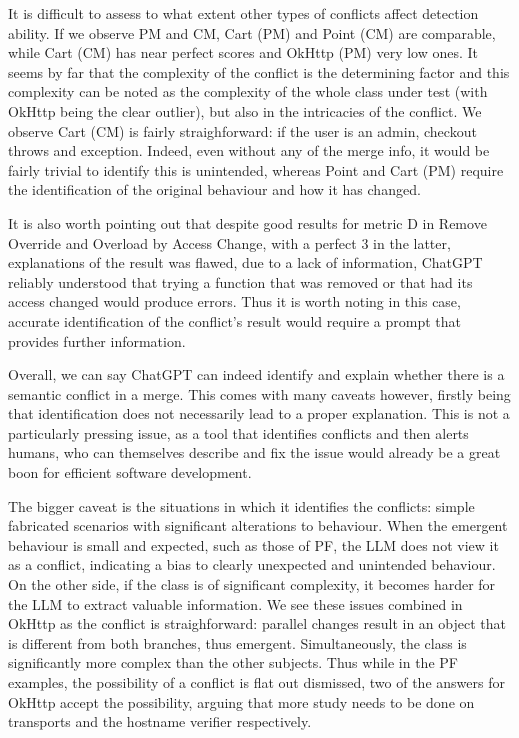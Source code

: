 It is difficult to assess to what extent other types of conflicts affect detection ability. If we observe PM and CM, Cart (PM) and Point (CM) are comparable, while Cart (CM) has near perfect scores and OkHttp (PM) very low ones.
It seems by far that the complexity of the conflict is the determining factor and this complexity can be noted as the complexity of the whole class under test (with OkHttp being the clear outlier), but also in the intricacies of the conflict.
We observe Cart (CM) is fairly straighforward: if the user is an admin, checkout throws and exception. Indeed, even without any of the merge info, it would be fairly trivial to identify this is unintended, whereas
Point and Cart (PM) require the identification of the original behaviour and how it has changed.

It is also worth pointing out that despite good results for metric D in Remove Override and Overload by Access Change, with a perfect 3 in the latter, explanations of the result was flawed, due to a lack of information, ChatGPT reliably understood that trying a function that was removed or that had its access changed would produce errors. Thus it is worth noting in this case, accurate identification of the conflict's result would require a prompt that provides further information.

Overall, we can say ChatGPT can indeed identify and explain whether there is a semantic conflict in a merge. This comes with many caveats however, firstly being that identification does not necessarily lead to a proper explanation. This is not a particularly pressing issue, as a tool that identifies conflicts and then alerts humans, who can themselves describe and fix the issue would already be a great boon for efficient software development.

The bigger caveat is the situations in which it identifies the conflicts: simple fabricated scenarios with significant alterations to behaviour. When the emergent behaviour is small and expected, such as those of PF, the LLM does not view it as a conflict, indicating a bias to clearly unexpected and unintended behaviour. On the other side, if the class is of significant complexity, it becomes harder for the LLM to extract valuable information.
We see these issues combined in OkHttp as the conflict is straighforward: parallel changes result in an object that is different from both branches, thus emergent. Simultaneously, the class is significantly more complex than the other subjects. Thus while in the PF examples, the possibility of a conflict is flat out dismissed,
two of the answers for OkHttp accept the possibility, arguing that more study needs to be done on transports and the hostname verifier respectively.

